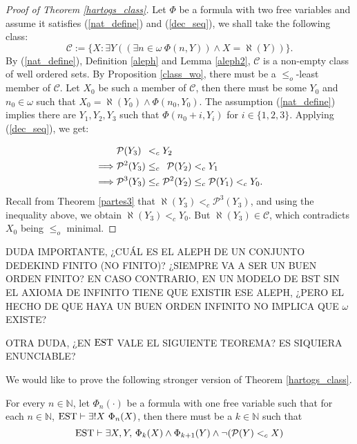 \begin{proof}[Proof of Theorem \ref{hartogs_class}]
	Let $\Phi$ be a formula with two free variables and assume it satisfies (\ref{nat_define}) and (\ref{dec_seq}), we shall take the following class:
	\[
		 \mathcal{C} := \{X: \exists Y ((\exists n\in\omega \ \Phi(n,Y)) \land X = \aleph(Y))\}.
	\]
	By (\ref{nat_define}), Definition \ref{aleph} and Lemma \ref{aleph2}, $\mathcal{C}$ is a non-empty class of well ordered sets. By Proposition \ref{class_wo}, there must be a $\leq_o$-least member of $\mathcal{C}$.
	Let $X_0$ be such a member of $\mathcal{C}$, then there must be some $Y_0$ and $n_0 \in\omega$ such that $X_0 = \aleph(Y_0) \land \Phi(n_0,Y_0)$.
	The assumption (\ref{nat_define}) implies there are $Y_1 , Y_2, Y_3$ such that $\Phi(n_0 + i , Y_i)$ for $i\in\{1,2,3\}$.
	Applying (\ref{dec_seq}), we get:
	
	\begin{align*}
		&\mathcal{P}(Y_3) \hspace{4.5 pt} <_c Y_2
		\\ \implies &\mathcal{P}^2(Y_3) \leq_c \hspace{4.5 pt} \mathcal{P}(Y_2) <_c Y_1
		\\ \implies &\mathcal{P}^3(Y_3) \leq_c \mathcal{P}^{2}(Y_2) \leq_c \mathcal{P}(Y_1) <_c Y_0.
	\end{align*}
	Recall from Theorem \ref{partes3} that $\aleph(Y_3) <_c \mathcal{P}^{3}(Y_3)$, and using the inequality above, we obtain $\aleph(Y_3) <_c Y_0$. But $\aleph(Y_3)\in\mathcal{C}$, which contradicts $X_0$ being $\leq_o$ minimal. 
\end{proof}

DUDA IMPORTANTE, ¿CUÁL ES EL ALEPH DE UN CONJUNTO DEDEKIND FINITO (NO FINITO)? ¿SIEMPRE VA A SER UN BUEN ORDEN FINITO? EN CASO CONTRARIO, EN UN MODELO DE BST SIN EL AXIOMA DE INFINITO TIENE QUE EXISTIR ESE ALEPH, ¿PERO EL HECHO DE QUE HAYA UN BUEN ORDEN INFINITO NO IMPLICA QUE $\omega$ EXISTE?

OTRA DUDA, ¿EN $\estf$ VALE EL SIGUIENTE TEOREMA? ES SIQUIERA ENUNCIABLE?

We would like to prove the following stronger version of Theorem \ref{hartogs_class}.

\begin{theorem}[$\estf$]
	\label{hartogs_inf_classes}
	For every $n\in\mathbb{N}$, let $\Phi_n(\cdot)$ be a formula with one free variable such that for each $n\in\mathbb{N}$, $\operatorname{EST} \vdash \exists! X \ \Phi_n (X)$, then there must be a $k \in \mathbb{N}$ such that 
	\[
		\operatorname{EST} \vdash \exists X,Y ,\, \Phi_k (X) \land \Phi_{k+1} (Y) \land \neg(\mathcal{P}(Y) <_c X)
	\]
\end{theorem}

